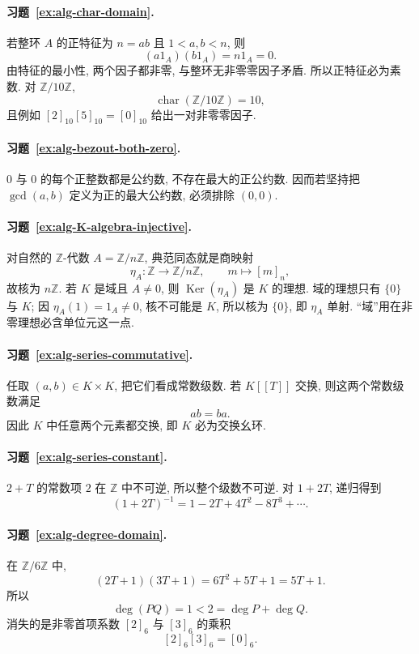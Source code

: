 \documentclass[usesamecnt, thmcnt=section, lang=cn, newtx, 10pt, scheme=chinese]{elegantbook}
\begin{document}
\paragraph*{习题~\ref{ex:alg-char-domain}.}
若整环 $A$ 的正特征为 $n=ab$ 且 $1<a,b<n$, 则
\[
 (a1_A)(b1_A)=n1_A=0.
\]
由特征的最小性, 两个因子都非零, 与整环无非零零因子矛盾. 所以正特征必为素数. 对 $\mathbb Z/10\mathbb Z$,
\[
 \operatorname{char}(\mathbb Z/10\mathbb Z)=10,
\]
且例如 $[2]_{10}[5]_{10}=[0]_{10}$ 给出一对非零零因子.


\paragraph*{习题~\ref{ex:alg-bezout-both-zero}.}
$0$ 与 $0$ 的每个正整数都是公约数, 不存在最大的正公约数. 因而若坚持把 $\gcd(a,b)$ 定义为正的最大公约数, 必须排除 $(0,0)$.









\paragraph*{习题~\ref{ex:alg-K-algebra-injective}.}
对自然的 $\mathbb Z$-代数 $A=\mathbb Z/n\mathbb Z$, 典范同态就是商映射
\[
 \eta_A:\mathbb Z\to\mathbb Z/n\mathbb Z,
 \qquad m\mapsto [m]_n,
\]
故核为 $n\mathbb Z$. 若 $K$ 是域且 $A\neq0$, 则 $\operatorname{Ker}(\eta_A)$ 是 $K$ 的理想. 域的理想只有 $\{0\}$ 与 $K$; 因 $\eta_A(1)=1_A\neq0$, 核不可能是 $K$, 所以核为 $\{0\}$, 即 $\eta_A$ 单射. ``域''用在非零理想必含单位元这一点.


\paragraph*{习题~\ref{ex:alg-series-commutative}.}
任取 $(a,b)\in K\times K$, 把它们看成常数级数. 若 $K[\![T]\!]$ 交换, 则这两个常数级数满足
\[
 ab=ba.
\]
因此 $K$ 中任意两个元素都交换, 即 $K$ 必为交换幺环.

\paragraph*{习题~\ref{ex:alg-series-constant}.}
$2+T$ 的常数项 $2$ 在 $\mathbb Z$ 中不可逆, 所以整个级数不可逆. 对 $1+2T$, 递归得到
\[
 (1+2T)^{-1}=1-2T+4T^2-8T^3+\cdots.
\]

\paragraph*{习题~\ref{ex:alg-degree-domain}.}
在 $\mathbb Z/6\mathbb Z$ 中,
\[
 (2T+1)(3T+1)=6T^2+5T+1=5T+1.
\]
所以
\[
 \deg(PQ)=1<2=\deg P+\deg Q.
\]
消失的是非零首项系数 $[2]_6$ 与 $[3]_6$ 的乘积
\[
 [2]_6[3]_6=[0]_6.
\]
\end{document}
